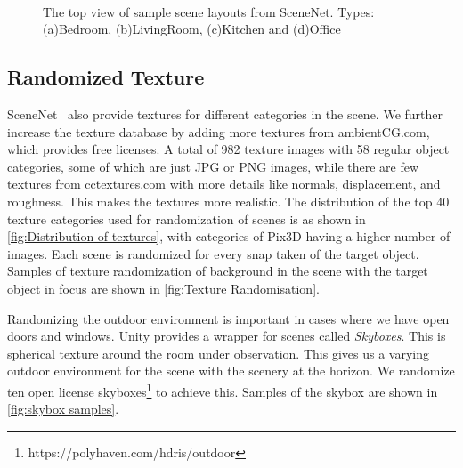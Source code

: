 \begin{figure}[!ht]
    \centering
    \quad
    \\
    \quad
    \caption{The top view of sample scene layouts from SceneNet. Types: (a)Bedroom, (b)LivingRoom, (c)Kitchen and (d)Office}
    \label{fig:Scene Types}
\end{figure}

\subsection{Randomized Texture}\label{subsec:randomised-texture}

SceneNet~\cite{McCormac:etal:ICCV2017} also provide textures for different categories in the scene.
We further increase the texture database by adding more textures from ambientCG.com, which provides free licenses.
A total of 982 texture images with 58 regular object categories, some of which are just JPG or PNG images, while there are few textures from cctextures.com with more details like normals, displacement, and roughness.
This makes the textures more realistic.
The distribution of the top 40 texture categories used for randomization of scenes is as shown in \autoref{fig:Distribution of textures}, with categories of Pix3D
having a higher number of images.
Each scene is randomized for every snap taken of the target object.
Samples of texture randomization of background in the scene with the target object in focus are shown in \autoref{fig:Texture Randomisation}.

Randomizing the outdoor environment is important in cases where we have open doors and windows.
Unity provides a wrapper for scenes called \emph{Skyboxes}.
This is spherical texture around the room under observation.
This gives us a varying outdoor environment for the scene with the scenery at the horizon.
We randomize ten open license skyboxes\footnote{https://polyhaven.com/hdris/outdoor} to achieve this.
Samples of the skybox are shown in \autoref{fig:skybox samples}.


